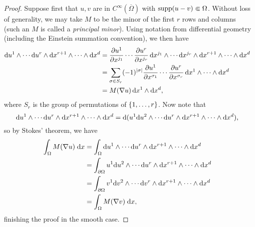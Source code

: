 \begin{proof}
    Suppose first that $u,v$ are in $C^\infty(\overline{\Omega})$ with $\operatorname{supp}(u-v) \Subset \Omega$. Without loss of generality, we may take $M$ to be the minor of the first $r$ rows and columns (such an $M$ is called a \textit{principal minor}). Using notation from differential geometry (including the Einstein summation convention), we then have 
    \begin{equation} \begin{aligned}
        \mathrm{d} u^1 \wedge \cdots \mathrm{d} u^r \wedge \mathrm{d} x^{r+1} \wedge \cdots \wedge \mathrm{d} x^d 
        &= \frac{\partial{u^1}}{\partial{x^{j_1}}} \cdots \frac{\partial{u^r}}{\partial{x^{j_r}}} \, \mathrm{d} x^{j_1} \wedge \cdots \mathrm{d} x^{j_r} \wedge \mathrm{d} x^{r+1} \wedge \cdots \wedge \mathrm{d} x^d \\
        &= \sum_{\sigma \in S_r} (-1)^{\left\lvert {\sigma} \right\rvert} \frac{\partial{u^1}}{\partial{x^{\sigma_1}}} \cdots \frac{\partial{u^r}}{\partial{x^{\sigma_r}}} \, \mathrm{d} x^1 \wedge \cdots \wedge \mathrm{d} x^d \\
        &= M(\nabla u) \, \mathrm{d} x^1 \wedge \mathrm{d} x^d,
    \end{aligned} \end{equation}
    where $S_r$ is the group of permutations of $\left\{ {1,\dots,r} \right\}$. Now note that 
    \begin{equation}
        \mathrm{d} u^1 \wedge \cdots \mathrm{d} u^r \wedge \mathrm{d} x^{r+1} \wedge \cdots \wedge \mathrm{d} x^d 
        = \mathrm{d}(u^1 \mathrm{d} u^2 \wedge \cdots \mathrm{d} u^r \wedge \mathrm{d} x^{r+1} \wedge \cdots \wedge \mathrm{d} x^d ),
    \end{equation}
    so by Stokes' theorem, we have 
    \begin{equation} \begin{aligned}
        \int_\Omega M(\nabla u) \; \mathrm{d} x &= \int_\Omega \mathrm{d} u^1 \wedge \cdots \mathrm{d} u^r \wedge \mathrm{d} x^{r+1} \wedge \cdots \wedge \mathrm{d} x^d \\
        &= \int_{\partial \Omega} u^1 \mathrm{d} u^2 \wedge \cdots \mathrm{d} u^r \wedge \mathrm{d} x^{r+1} \wedge \cdots \wedge \mathrm{d} x^d \\
        &= \int_{\partial \Omega} v^1 \mathrm{d} v^2 \wedge \cdots \mathrm{d} v^r \wedge \mathrm{d} x^{r+1} \wedge \cdots \wedge \mathrm{d} x^d \\
        &= \int_\Omega M(\nabla v) \; \mathrm{d} x,
    \end{aligned} \end{equation}
    finishing the proof in the smooth case.


\end{proof}
